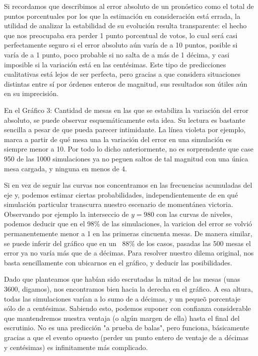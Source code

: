 \documentclass[12pt, a4paper]{article}
\begin{document}
Si recordamos que describimos al error absoluto de un pron\'ostico como el total de puntos porcentuales por los que la estimaci\'on en consideraci\'on est\'a errada,  la utilidad de analizar la estabilidad de su evoluci\'on resulta transparente: el hecho que nos preocupaba era perder 1 punto porcentual de votos, lo cual ser\'a casi perfectamente seguro si el error absoluto a\'un var\'ia de a 10 puntos, posible si var\'ia de a 1 punto, poco probable si no salta de a m\'as de 1 d\'ecima, y casi imposible si la variaci\'on est\'a en las cent\'esimas. Este tipo de predicciones cualitativas est\'a lejos de ser perfecta, pero gracias a que considera situaciones distintas entre s\'i por \'ordenes enteros de magnitud, sus resultados son \'utiles a\'un en su imprecisi\'on.

En el Gr\'afico 3: Cantidad de mesas en las que se estabiliza la variaci\'on del error absoluto, se puede observar esquem\'aticamente esta idea. Su lectura es bastante sencilla a pesar de que pueda parecer intimidante. La l\'inea violeta por ejemplo, marca a partir de qu\'e mesa una la variaci\'on del error en una simulaci\'on es siempre menor a 10. Por todo lo dicho anteriormente, no es sorprendente que case 950 de las 1000 simulaciones ya no peguen saltos de tal magnitud con una \'unica mesa cargada, y ninguna en menos de 4. 

Si en vez de seguir las curvas nos concentramos en las frecuencias acumuladas del eje y, podemos estimar ciertas probabilidades, independientemente de en qu\'e simulaci\'on particular transcurra nuestro escenario de moment\'anea victoria. Observando por ejemplo la interseccio de $y=980$ con las curvas de niveles, podemos deducir que en el 98\% de las simulaciones, la varicion del error se volvi\'o permanentemente menor a 1 en las primeras cincuenta mesas. De manera similar, se puede inferir del gr\'afico que en un ~88\% de los casos, pasadas las 500 mesas el error ya no var\'ia m\'as que de a d\'ecimas. Para resolver nuestro dilema original, nos basta sencillamente con ubicarnos en el gr\'afico, y deducir las posibilidades.

Dado que planteamos que hab\'ian sido escrutadas la mitad de las mesas (unas 3600, digamos), nos encontramos bien hacia la derecha en el gr\'afico. A esa altura, todas las simulaciones var\'ian a lo sumo de a d\'ecimas, y un peque\~o porcentaje s\'olo de a cent\'esimas. Sabiendo esto, podemos suponer con confianza considerable que mantendremos nuestra ventaja (o alg\'un margen de ella) hasta el final del escrutinio. No es una predicci\'on "a prueba de balas", pero funciona, b\'asicamente gracias a que el evento opuesto (perder un punto entero de ventaje de a d\'ecimas y cent\'esimas) es infinitamente m\'as complicado.
\end{document}
